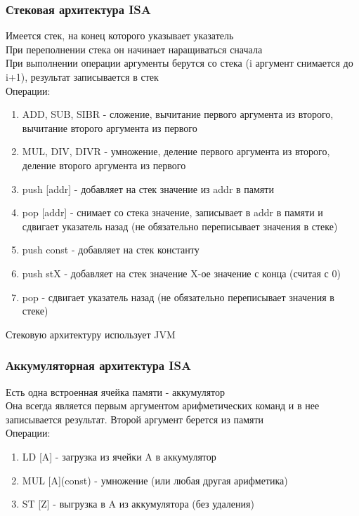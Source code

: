 \documentclass[12pt]{article}
\begin{document}
\subsubsection{Стековая архитектура ISA}
Имеется стек, на конец которого указывает указатель\\
При переполнении стека он начинает наращиваться сначала\\
При выполнении операции аргументы берутся со стека (i аргумент снимается до i+1), результат записывается в стек\\
Операции:
\begin{enumerate}
    \item ADD, SUB, SIBR - сложение, вычитание первого аргумента из второго, вычитание второго аргумента из первого
    \item MUL, DIV, DIVR - умножение, деление первого аргумента из второго, деление второго аргумента из первого
    \item push [addr] - добавляет на стек значение из addr в памяти
    \item pop [addr] - снимает со стека значение, записывает в addr в памяти и сдвигает указатель назад (не обязательно переписывает значения в стеке)
    \item push const - добавляет на стек константу
    \item push stX - добавляет на стек значение X-ое значение с конца (считая с 0)
    \item pop - сдвигает указатель назад (не обязательно переписывает значения в стеке)
\end{enumerate}
Стековую архитектуру использует JVM
\subsubsection{Аккумуляторная архитектура ISA}
Есть одна встроенная ячейка памяти - аккумулятор\\
Она всегда является первым аргументом арифметических команд и в нее записывается результат. Второй аргумент берется из памяти\\
Операции:
\begin{enumerate}
    \item LD [A] - загрузка из ячейки A в аккумулятор
    \item MUL [A](const) - умножение (или любая другая арифметика)
    \item ST [Z] - выгрузка в A из аккумулятора (без удаления)
\end{enumerate}
\end{document}
